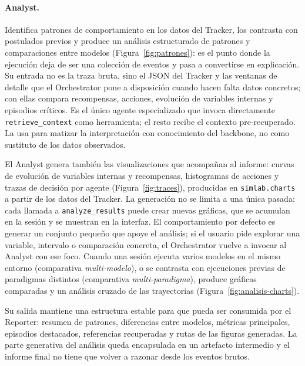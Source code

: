 \paragraph{Analyst.} Identifica patrones de comportamiento en los datos del
Tracker, los contrasta con postulados previos y produce un análisis
estructurado de patrones y comparaciones entre modelos
(Figura~\ref{fig:patrones}): es el punto donde la ejecución deja de ser una
colección de eventos y pasa a convertirse en explicación. Su entrada no es la traza bruta,
sino el JSON del Tracker y las ventanas de detalle que el Orchestrator pone a
disposición cuando hacen falta datos concretos; con ellas compara recompensas,
acciones, evolución de variables internas y episodios críticos. Es el único
agente especializado que invoca directamente \texttt{retrieve\_context} como
herramienta; el resto recibe el contexto pre-recuperado. La usa para
matizar la interpretación con conocimiento del backbone, no como sustituto de
los datos observados.

El Analyst genera también las visualizaciones que
acompañan al informe: curvas de evolución de variables internas y
recompensas, histogramas de acciones y trazas de decisión por agente
(Figura~\ref{fig:traces}), producidas en \texttt{simlab.charts} a partir de
los datos del Tracker. La
generación no se limita a una única pasada: cada llamada a
\texttt{analyze\_results} puede crear nuevas gráficas, que se acumulan en la
sesión y se muestran en la interfaz. El comportamiento por defecto es generar
un conjunto pequeño que apoye el análisis; si el usuario pide explorar una
variable, intervalo o comparación concreta, el Orchestrator vuelve a invocar
al Analyst con ese foco. Cuando una sesión ejecuta varios modelos en el mismo
entorno (comparativa \emph{multi-modelo}), o se contrasta con ejecuciones
previas de paradigmas distintos (comparativa \emph{multi-paradigma}), produce
gráficas comparadas y un análisis cruzado de las trayectorias
(Figura~\ref{fig:analisis-charts}).

Su salida mantiene una estructura estable para que pueda ser consumida por
el Reporter: resumen de patrones, diferencias entre modelos, métricas
principales, episodios destacados, referencias recuperadas y rutas de las
figuras generadas. La parte generativa del análisis queda encapsulada en
un artefacto intermedio y el informe final no tiene que
volver a razonar desde los eventos brutos.

